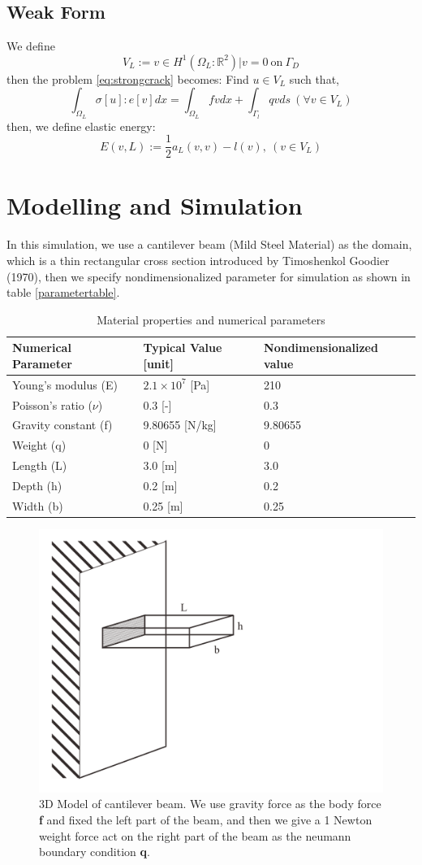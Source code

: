 \documentclass[a4paper,11pt]{article}
\newcommand{\R}{\mathbb{R}}
\begin{document}
\subsection{Weak Form}
We define $$V_L := {v \in H^1(\Omega_L : \R^2)| v=0}\ \text{on}\ \Gamma_D$$
then the problem \eqref{eq:strongcrack} becomes:
Find $u\in V_L$ such that,
\begin{equation}\label{eq:weakcrack}
\int_{\Omega_L} \sigma[u] : e[v] dx = \int_{\Omega_L} fv dx + \int_{\Gamma_l} qv ds\ (\forall  v \in V_L)
\end{equation}
then, we define elastic energy:
\begin{equation}\label{eq:elasticen}
E(v,L) := \frac{1}{2}a_L(v,v) - l(v),\ (v\in V_L)
\end{equation}
\newpage
\section{Modelling and Simulation}
In this simulation, we use a cantilever beam (Mild Steel Material) as the domain, which is a thin rectangular cross section introduced by Timoshenkol Goodier (1970), then we specify nondimensionalized parameter for simulation as shown in table \ref{parametertable}.
\begin{table}[h!]
	\centering
	\begin{tabular}{|l|l|l|}
		\hline
		Numerical Parameter & Typical Value [unit] & Nondimensionalized value\\
		\hline
		Young's modulus (E) & $2.1 \times 10^7$ [Pa] & 210\\
		Poisson's ratio ($\nu$) & 0.3 [-] & 0.3\\
		Gravity constant (f) & 9.80655 [N/kg] & 9.80655\\
		Weight (q) & 0 [N] & 0\\
		Length (L) & 3.0 [m] & 3.0\\
		Depth (h) & 0.2 [m] & 0.2\\
		Width (b) & 0.25 [m] & 0.25\\
		\hline
	\end{tabular}
\caption{Material properties and numerical parameters}
\label{tab:parametertable}
\end{table}
\newline
\begin{figure}[h!]
	\centering
	\includegraphics[width=0.5\linewidth]{picture/3dmodellinearelasticity}
	\caption{3D Model of cantilever beam. We use gravity force as the body force \textbf{f} and fixed the left part of the beam, and then we give a 1 Newton weight force act on the right part of the beam as the neumann boundary condition \textbf{q}.}
	\label{fig:3dmodel}
\end{figure}
\end{document}
